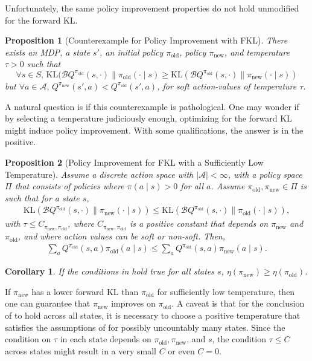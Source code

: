 \documentclass[twoside,11pt]{article}
\newcommand{\actionspace}{\mathcal{A}}
\newcommand{\KL}{\mathrm{KL}}
\newcommand{\boltzmannQ}{\mathcal{B}Q}
\newcommand{\pinew}{{\pi_\mathrm{new}}}
\newcommand{\piold}{{\pi_\mathrm{old}}}
\newtheorem{proposition}{Proposition}
\newtheorem{corollary}{Corollary}
\begin{document}
Unfortunately, the same policy improvement properties do not hold unmodified for the forward KL. 
\begin{proposition}[Counterexample for Policy Improvement with FKL]\label{lem:forward-kl-counterexample}
There exists an MDP, a state $s'$, an initial policy $\piold$, policy $\pinew$, and temperature $\tau > 0$ such that
\begin{equation*}
    \forall s \in S,\, \KL(\boltzmannQ^\piold(s, \cdot) \parallel \piold(\cdot \mid s) \geq \KL(\boltzmannQ^\piold(s, \cdot) \parallel \pinew(\cdot \mid s))
    \end{equation*}
but $\forall a \in \actionspace, \, Q^\pinew(s', a) < Q^\piold(s', a)$, for soft action-values of temperature $\tau$. 
\end{proposition}
%
A natural question is if this counterexample is pathological. %
One may wonder if by selecting a temperature judiciously enough, optimizing for the forward KL might induce policy improvement. With some qualifications, the answer is in the positive. 
%
\begin{proposition}[Policy Improvement for FKL with a Sufficiently Low Temperature]\label{prop:forward-kl-surrogate-2}
Assume a discrete action space with $|\actionspace| < \infty$, with a policy space $\Pi$ that consists of policies where $\pi(a \mid s) > 0$ for all $a$. Assume $\piold, \pinew \in \Pi$ is such that for a state $s$,
\begin{align}\label{eq:forward-improvement}
    \KL(\boltzmannQ^{\piold}(s, \cdot) \parallel \pinew (\cdot \mid s)) \leq \KL(\boltzmannQ^{\piold}(s, \cdot) \parallel \piold(\cdot \mid s)),
\end{align}
with $\tau \leq C_{\pinew, \piold}$, where $C_{\pinew, \piold}$ is a positive constant that depends on $\pinew$ and $\piold$, and where action values can be soft or non-soft. Then,
\begin{align*}
    \sum_a Q^{\piold}(s, a) \piold(a \mid s) \leq \sum_a Q^{\piold}(s, a) \pinew(a \mid s). 
\end{align*}
\end{proposition}


\begin{corollary}
If the conditions in  hold true for all states $s$, $\eta(\pinew) \geq \eta(\piold)$. 
\end{corollary}
%
If $\pinew$ has a lower forward KL than $\piold$ for sufficiently low temperature, then one can guarantee that $\pinew$ improves on $\piold$. A caveat is that for the conclusion of  to hold across all states, it is necessary to choose a positive temperature that satisfies the assumptions of  for possibly uncountably many states. Since the condition on $\tau$ in each state depends on $\piold, \pinew$, and $s$, the condition $\tau \le C$ across states might result in a very small $C$ or even $C=0$.  
 
\end{document}
